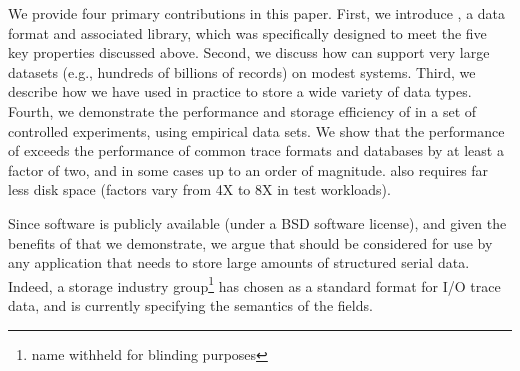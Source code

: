


We provide four primary contributions in this paper.  First, we
introduce \DataSeries{}, a data format and associated library, which was
specifically designed to meet the five key properties discussed above.
Second, we discuss how \DataSeries{} can support
very large datasets (e.g., hundreds of billions of records) on modest
systems.
Third, we describe how we
have used \DataSeries{} in practice to store a wide variety of data
types.
Fourth, we demonstrate the performance and storage efficiency of 
\DataSeries{} in a set of
controlled experiments, using empirical data sets. We show that the
performance of \DataSeries{} exceeds the performance of common trace
formats and databases by at least a factor of two, and in some cases up to an
order of magnitude. \DataSeries{} also requires far less disk space (factors
vary from 4X to 8X in test workloads).

Since \DataSeries{} software is publicly available
(under a BSD software license), and given the benefits of \DataSeries{} that we demonstrate, we argue that \DataSeries{} should be considered
for use by any application that needs to store large amounts of structured
serial data. Indeed, a storage industry group\footnote{name withheld for blinding purposes} has chosen
\DataSeries{} as a standard format for I/O trace data, and is currently
specifying the semantics of the fields.

